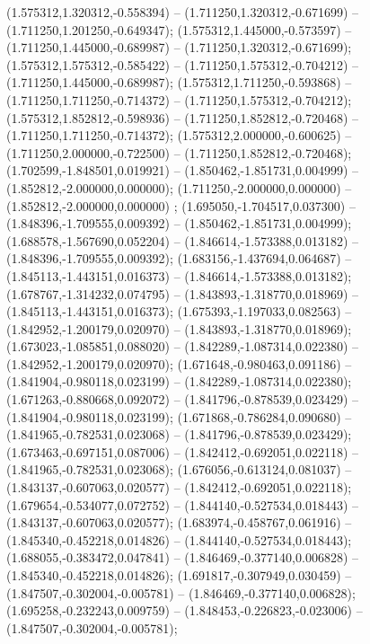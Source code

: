  (1.575312,1.320312,-0.558394) -- (1.711250,1.320312,-0.671699) -- (1.711250,1.201250,-0.649347);
 (1.575312,1.445000,-0.573597) -- (1.711250,1.445000,-0.689987) -- (1.711250,1.320312,-0.671699);
 (1.575312,1.575312,-0.585422) -- (1.711250,1.575312,-0.704212) -- (1.711250,1.445000,-0.689987);
 (1.575312,1.711250,-0.593868) -- (1.711250,1.711250,-0.714372) -- (1.711250,1.575312,-0.704212);
 (1.575312,1.852812,-0.598936) -- (1.711250,1.852812,-0.720468) -- (1.711250,1.711250,-0.714372);
 (1.575312,2.000000,-0.600625) -- (1.711250,2.000000,-0.722500) -- (1.711250,1.852812,-0.720468);
 (1.702599,-1.848501,0.019921) -- (1.850462,-1.851731,0.004999) -- (1.852812,-2.000000,0.000000);
 (1.711250,-2.000000,0.000000) -- (1.852812,-2.000000,0.000000) ;
 (1.695050,-1.704517,0.037300) -- (1.848396,-1.709555,0.009392) -- (1.850462,-1.851731,0.004999);
 (1.688578,-1.567690,0.052204) -- (1.846614,-1.573388,0.013182) -- (1.848396,-1.709555,0.009392);
 (1.683156,-1.437694,0.064687) -- (1.845113,-1.443151,0.016373) -- (1.846614,-1.573388,0.013182);
 (1.678767,-1.314232,0.074795) -- (1.843893,-1.318770,0.018969) -- (1.845113,-1.443151,0.016373);
 (1.675393,-1.197033,0.082563) -- (1.842952,-1.200179,0.020970) -- (1.843893,-1.318770,0.018969);
 (1.673023,-1.085851,0.088020) -- (1.842289,-1.087314,0.022380) -- (1.842952,-1.200179,0.020970);
 (1.671648,-0.980463,0.091186) -- (1.841904,-0.980118,0.023199) -- (1.842289,-1.087314,0.022380);
 (1.671263,-0.880668,0.092072) -- (1.841796,-0.878539,0.023429) -- (1.841904,-0.980118,0.023199);
 (1.671868,-0.786284,0.090680) -- (1.841965,-0.782531,0.023068) -- (1.841796,-0.878539,0.023429);
 (1.673463,-0.697151,0.087006) -- (1.842412,-0.692051,0.022118) -- (1.841965,-0.782531,0.023068);
 (1.676056,-0.613124,0.081037) -- (1.843137,-0.607063,0.020577) -- (1.842412,-0.692051,0.022118);
 (1.679654,-0.534077,0.072752) -- (1.844140,-0.527534,0.018443) -- (1.843137,-0.607063,0.020577);
 (1.683974,-0.458767,0.061916) -- (1.845340,-0.452218,0.014826) -- (1.844140,-0.527534,0.018443);
 (1.688055,-0.383472,0.047841) -- (1.846469,-0.377140,0.006828) -- (1.845340,-0.452218,0.014826);
 (1.691817,-0.307949,0.030459) -- (1.847507,-0.302004,-0.005781) -- (1.846469,-0.377140,0.006828);
 (1.695258,-0.232243,0.009759) -- (1.848453,-0.226823,-0.023006) -- (1.847507,-0.302004,-0.005781);
